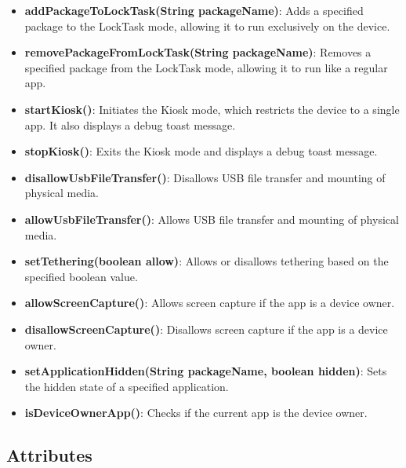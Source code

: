 \begin{itemize}
  \item \textbf{addPackageToLockTask(String packageName)}: Adds a specified package to the LockTask mode, allowing it to run exclusively on the device.

  \item \textbf{removePackageFromLockTask(String packageName)}: Removes a specified package from the LockTask mode, allowing it to run like a regular app.

  \item \textbf{startKiosk()}: Initiates the Kiosk mode, which restricts the device to a single app. It also displays a debug toast message.

  \item \textbf{stopKiosk()}: Exits the Kiosk mode and displays a debug toast message.

  \item \textbf{disallowUsbFileTransfer()}: Disallows USB file transfer and mounting of physical media.

  \item \textbf{allowUsbFileTransfer()}: Allows USB file transfer and mounting of physical media.

  \item \textbf{setTethering(boolean allow)}: Allows or disallows tethering based on the specified boolean value.

  \item \textbf{allowScreenCapture()}: Allows screen capture if the app is a device owner.

  \item \textbf{disallowScreenCapture()}: Disallows screen capture if the app is a device owner.

  \item \textbf{setApplicationHidden(String packageName, boolean hidden)}: Sets the hidden state of a specified application.

  \item \textbf{isDeviceOwnerApp()}: Checks if the current app is the device owner.
\end{itemize}

\subsection{Attributes}

